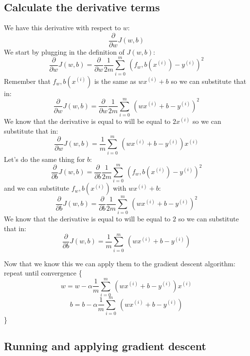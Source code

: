 \subsection{Calculate the derivative terms}

We have this derivative with respect to $w$:
$$ \frac{\partial}{\partial w}J(w,b)$$
We start by plugging in the definition of $J(w,b)$:
$$ \frac{\partial}{\partial w}J(w,b)=\frac{\partial}{\partial w}\frac{1}{2m}\sum_{i=0}^{m}\ (f_w,b(x^{(i)})-y^{(i)})^2$$
Remember that $f_w,b(x^{(i)})$ is the same as $wx^{(i)}+b$ so we can substitute that in:
$$ \frac{\partial}{\partial w}J(w,b)=\frac{\partial}{\partial w}\frac{1}{2m}\sum_{i=0}^{m}\ (wx^{(i)}+b-y^{(i)})^2$$
We know that the derivative is equal to will be equal to $2x^{(i)}$ so we can substitute that in:
$$ \frac{\partial}{\partial w}J(w,b)=\frac{1}{m}\sum_{i=0}^{m}\ (wx^{(i)}+b-y^{(i)})x^{(i)}$$
Let's do the same thing for $b$:
$$ \frac{\partial}{\partial b}J(w,b)=\frac{\partial}{\partial b}\frac{1}{2m}\sum_{i=0}^{m}\ (f_w,b(x^{(i)})-y^{(i)})^2$$
and we can substitute $f_w,b(x^{(i)})$ with $wx^{(i)}+b$:
$$ \frac{\partial}{\partial b}J(w,b)=\frac{\partial}{\partial b}\frac{1}{2m}\sum_{i=0}^{m}\ (wx^{(i)}+b-y^{(i)})^2$$
We know that the derivative is equal to will be equal to $2$ so we can substitute that in:
$$ \frac{\partial}{\partial b}J(w,b)=\frac{1}{m}\sum_{i=0}^{m}\ (wx^{(i)}+b-y^{(i)})$$

Now that we know this we can apply them to the gradient descent algorithm:
repeat until convergence \{
$$ w=w-\alpha \frac{1}{m}\sum_{i=0}^{m}\ (wx^{(i)}+b-y^{(i)})x^{(i)}$$
$$ b=b-\alpha \frac{1}{m}\sum_{i=0}^{m}\ (wx^{(i)}+b-y^{(i)})$$
\}

\subsection{Running and applying gradient descent}

